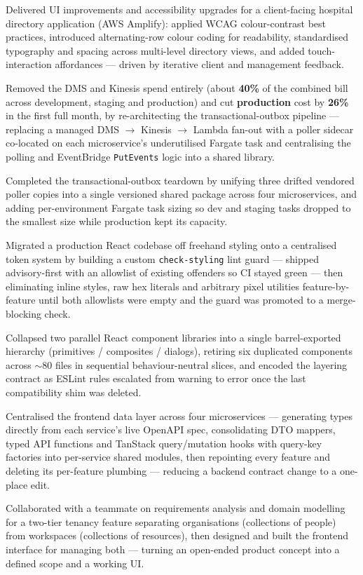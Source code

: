 \documentclass[letterpaper,11pt]{article}
\newcommand{\resumeItem}[1]{
  \item\small #1
}
\begin{document}
                \resumeItem{Delivered UI improvements and accessibility upgrades for a client-facing hospital directory application (AWS Amplify): applied WCAG colour-contrast best practices, introduced alternating-row colour coding for readability, standardised typography and spacing across multi-level directory views, and added touch-interaction affordances --- driven by iterative client and management feedback.}
                \resumeItem{Removed the DMS and Kinesis spend entirely (about \textbf{40\%} of the combined bill across development, staging and production) and cut \textbf{production} cost by \textbf{26\%} in the first full month, by re-architecting the transactional-outbox pipeline --- replacing a managed DMS $\rightarrow$ Kinesis $\rightarrow$ Lambda fan-out with a poller sidecar co-located on each microservice's underutilised Fargate task and centralising the polling and EventBridge \texttt{PutEvents} logic into a shared library.}
                \resumeItem{Completed the transactional-outbox teardown by unifying three drifted vendored poller copies into a single versioned shared package across four microservices, and adding per-environment Fargate task sizing so dev and staging tasks dropped to the smallest size while production kept its capacity.}
                \resumeItem{Migrated a production React codebase off freehand styling onto a centralised token system by building a custom \texttt{check-styling} lint guard --- shipped advisory-first with an allowlist of existing offenders so CI stayed green --- then eliminating inline styles, raw hex literals and arbitrary pixel utilities feature-by-feature until both allowlists were empty and the guard was promoted to a merge-blocking check.}
                \resumeItem{Collapsed two parallel React component libraries into a single barrel-exported hierarchy (primitives / composites / dialogs), retiring six duplicated components across $\sim$80 files in sequential behaviour-neutral slices, and encoded the layering contract as ESLint rules escalated from warning to error once the last compatibility shim was deleted.}
                \resumeItem{Centralised the frontend data layer across four microservices --- generating types directly from each service's live OpenAPI spec, consolidating DTO mappers, typed API functions and TanStack query/mutation hooks with query-key factories into per-service shared modules, then repointing every feature and deleting its per-feature plumbing --- reducing a backend contract change to a one-place edit.}
                \resumeItem{Collaborated with a teammate on requirements analysis and domain modelling for a two-tier tenancy feature separating organisations (collections of people) from workspaces (collections of resources), then designed and built the frontend interface for managing both --- turning an open-ended product concept into a defined scope and a working UI.}
\end{document}
